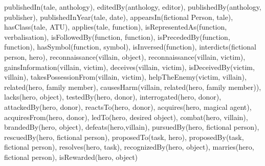 \documentclass[10pt,a4paper]{article}
\begin{document}
publishedIn(tale, anthology), editedBy(anthology, editor), publishedBy(anthology, publisher), publishedInYear(tale, date), appearsIn(fictional Person, tale), hasClass(tale, ATU), applies(tale, function), isRepresentedAs(function, verbalisation), isFollowedBy(function, function), isPrecededBy(function, function), hasSymbol(function, symbol), isInversed(function), interdicts(fictional person, hero), reconnaissance(villain, object), reconnaissance(villain, victim), gainsInformation(villain, victim), deceives(villain, victim), isDeceivedBy(victim, villain), takesPossessionFrom(villain, victim), helpTheEnemy(victim, villain), related(hero, family member), causesHarm(villain, related(hero, family member)), lacks(hero, object), testedBy(hero, donor), interrogated(hero, donor), attackedBy(hero, donor), reactsTo(hero, donor), acquires(hero, magical agent), acquiresFrom(hero, donor), ledTo(hero, desired object), combat(hero, villain), brandedBy(hero, object), defeats(hero,villain), pursuedBy(hero, fictional person), rescuedBy(hero, fictional person), proposedTo(task, hero), proposedBy(task, fictional person), resolves(hero, task), recognizedBy(hero, object), marries(hero, fictional person), isRewarded(hero, object)



\normalsize
\newpage
\end{document}
